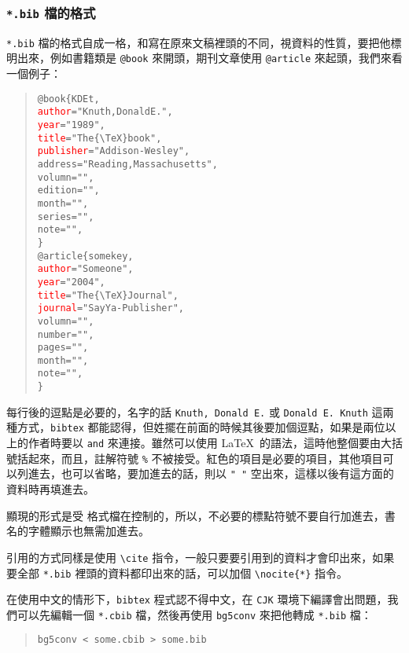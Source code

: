 \subsubsection{\texttt{*.bib} 檔的格式}

\texttt{*.bib} 檔的格式自成一格，和寫在原來文稿裡頭的不同，視資料的性質，要把他標明出來，例如書籍類是 \verb|@book| 來開頭，期刊文章使用 \verb|@article| 來起頭，我們來看一個例子：

\begin{quote}
  \begin{alltt}
    @book\{ KDEt,
    \textcolor{red}{author}      = "Knuth, Donald E.",
    \textcolor{red}{year}        = "1989",
    \textcolor{red}{title}       = "The \verb|{\TeX}|book",
    \textcolor{red}{publisher}   = "Addison-Wesley",
    address     = "Reading, Massachusetts",
    volumn      = " ",
    edition     = " ",
    month       = " ",
    series      = " ",
    note        = " ",
    \}
    @article\{ somekey,
    \textcolor{red}{author}      = "Someone",
    \textcolor{red}{year}        = "2004",
    \textcolor{red}{title}       = "The \verb|{\TeX}| Journal",
    \textcolor{red}{journal}     = "SayYa-Publisher",
    volumn      = " ",
    number      = " ",
    pages       = " ",
    month       = " ",
    note        = " ",
    \}
  \end{alltt}
\end{quote}

每行後的逗點是必要的，名字的話 \texttt{Knuth, Donald E.} 或 \texttt{Donald E. Knuth} 這兩種方式，\texttt{bibtex} 都能認得，但姓擺在前面的時候其後要加個逗點，如果是兩位以上的作者時要以 \texttt{and} 來連接。雖然可以使用 \LaTeX\ 的語法，這時他整個要由大括號括起來，而且，註解符號 \texttt{\%} 不被接受。紅色的項目是必要的項目，其他項目可以列進去，也可以省略，要加進去的話，則以 \texttt{" "} 空出來，這樣以後有這方面的資料時再填進去。

顯現的形式是受  格式檔在控制的，所以，不必要的標點符號不要自行加進去，書名的字體顯示也無需加進去。

引用的方式同樣是使用 \verb|\cite| 指令，一般只要要引用到的資料才會印出來，如果要全部 \texttt{*.bib} 裡頭的資料都印出來的話，可以加個 \verb|\nocite{*}| 指令。

在使用中文的情形下，\texttt{bibtex} 程式認不得中文，在 \texttt{CJK} 環境下編譯會出問題，我們可以先編輯一個 \texttt{*.cbib} 檔，然後再使用 \texttt{bg5conv} 來把他轉成 \texttt{*.bib} 檔：

\begin{quote}
  \begin{verbatim}
bg5conv < some.cbib > some.bib
\end{verbatim}
\end{quote}

